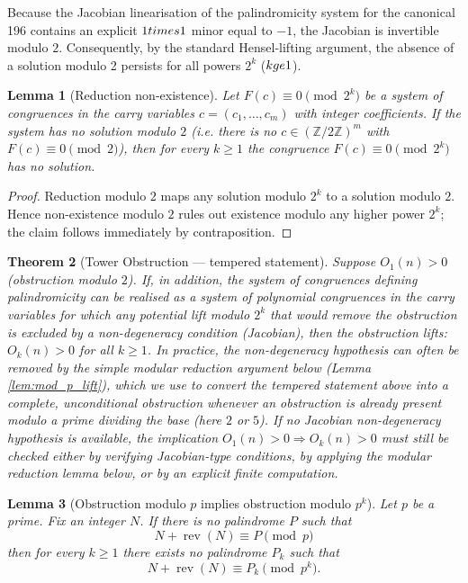 \documentclass[12pt,a4paper]{article}
\newtheorem{theorem}{Theorem}[section]
\newtheorem{lemma}[theorem]{Lemma}
\begin{document}
Because the Jacobian linearisation of the palindromicity system for the canonical 196 contains an explicit $1\\times1$ minor equal to $-1$, the Jacobian is invertible modulo $2$. Consequently, by the standard Hensel-lifting argument, the absence of a solution modulo 2 persists for all powers $2^{k}$ ($k\\ge 1$).
\begin{lemma}[Reduction non-existence]
\label{lem:reduction_nonexist-5}
Let $F(c)\equiv 0\pmod{2^k}$ be a system of congruences in the carry variables $c=(c_1,\dots,c_m)$ with integer coefficients. If the system has no solution modulo $2$ (i.e. there is no $c\in(\mathbb Z/2\mathbb Z)^m$ with $F(c)\equiv0\pmod 2$), then for every $k\ge1$ the congruence $F(c)\equiv0\pmod{2^k}$ has no solution.
\end{lemma}

\begin{proof}
Reduction modulo $2$ maps any solution modulo $2^k$ to a solution modulo $2$. Hence non-existence modulo $2$ rules out existence modulo any higher power $2^k$; the claim follows immediately by contraposition.
\end{proof}

\begin{theorem}[Tower Obstruction --- tempered statement]\label{thm:tower-5}
Suppose $O_1(n) > 0$ (obstruction modulo $2$). If, in addition, the system of congruences defining palindromicity can be realised as a system of polynomial congruences in the carry variables for which any potential lift modulo $2^k$ that would remove the obstruction is excluded by a non-degeneracy condition (Jacobian), then the obstruction lifts: $O_k(n) > 0$ for all $k\ge 1$.
In practice, the non-degeneracy hypothesis can often be removed by the simple modular reduction argument below (Lemma \ref{lem:mod_p_lift}), which we use to convert the tempered statement above into a complete, unconditional obstruction whenever an obstruction is already present modulo a prime dividing the base (here $2$ or $5$).
If no Jacobian non-degeneracy hypothesis is available, the implication $O_1(n)>0 \Rightarrow O_k(n)>0$ must still be checked either by verifying Jacobian-type conditions, by applying the modular reduction lemma below, or by an explicit finite computation.
\end{theorem}

\begin{lemma}[Obstruction modulo $p$ implies obstruction modulo $p^k$]
Let $p$ be a prime. Fix an integer $N$. If there is no palindrome $P$ such that
$$N+\operatorname{rev}(N)\equiv P\pmod p$$
then for every $k\ge1$ there exists no palindrome $P_k$ such that
$$N+\operatorname{rev}(N)\equiv P_k\pmod{p^k}.$$
\end{lemma}
\end{document}
